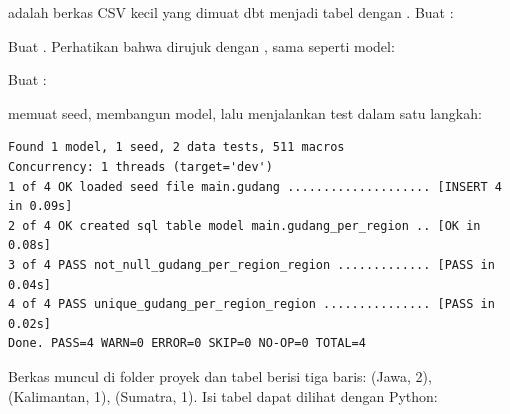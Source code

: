   adalah berkas CSV kecil yang dimuat dbt menjadi tabel dengan . Buat :


 Buat . Perhatikan bahwa  dirujuk dengan , sama seperti model:


 Buat :


  memuat seed, membangun model, lalu menjalankan test dalam satu langkah:
\begin{lstlisting}[style=term, caption={Keluaran \kode{dbt build --profiles-dir .} pada latihan (diringkas dari \kode{03\_build.txt}).}, label={lst:buildlatihan}]
Found 1 model, 1 seed, 2 data tests, 511 macros
Concurrency: 1 threads (target='dev')
1 of 4 OK loaded seed file main.gudang .................... [INSERT 4 in 0.09s]
2 of 4 OK created sql table model main.gudang_per_region .. [OK in 0.08s]
3 of 4 PASS not_null_gudang_per_region_region ............. [PASS in 0.04s]
4 of 4 PASS unique_gudang_per_region_region ............... [PASS in 0.02s]
Done. PASS=4 WARN=0 ERROR=0 SKIP=0 NO-OP=0 TOTAL=4
\end{lstlisting}

\begin{cekberhasil}
Berkas  muncul di folder proyek dan tabel  berisi tiga baris: (Jawa, 2), (Kalimantan, 1), (Sumatra, 1). Isi tabel dapat dilihat dengan Python:\\
\end{cekberhasil}

